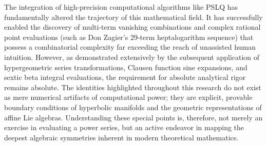 \documentclass[10pt]{article}
\begin{document}
The integration of high-precision computational algorithms like PSLQ has fundamentally altered the trajectory of this mathematical field. It has successfully enabled the discovery of multi-term vanishing combinations and complex rational point evaluations (such as Don Zagier's 29-term heptalogarithm sequence) that possess a combinatorial complexity far exceeding the reach of unassisted human intuition. However, as demonstrated extensively by the subsequent application of hypergeometric series transformations, Clausen function sine expansions, and sextic beta integral evaluations, the requirement for absolute analytical rigor remains absolute. The identities highlighted throughout this research do not exist as mere numerical artifacts of computational power; they are explicit, provable boundary conditions of hyperbolic manifolds and the geometric representations of affine Lie algebras. Understanding these special points is, therefore, not merely an exercise in evaluating a power series, but an active endeavor in mapping the deepest algebraic symmetries inherent in modern theoretical mathematics.
\end{document}
